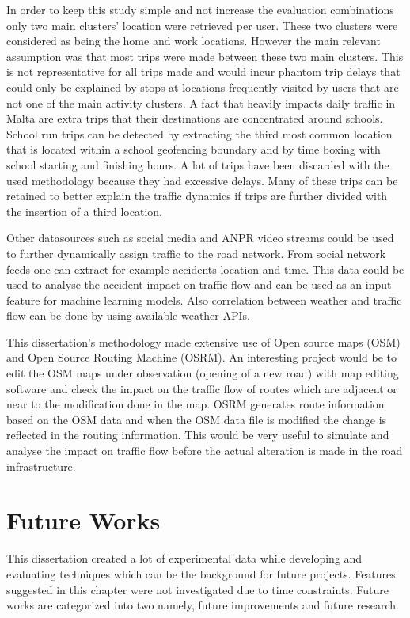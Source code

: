 \documentclass[12pt, a4paper]{report}
\theoremstyle{definition}
\theoremstyle{definition}%
\theoremstyle{definition}%
\theoremstyle{definition}%
\theoremstyle{definition}%
\theoremstyle{definition}%
\begin{document}
In order to keep this study simple and not increase the evaluation combinations only two main clusters' location were retrieved per user. These two clusters were considered as being the home and work locations. However the main relevant assumption was that most trips were made between these two main clusters. This is not representative for all trips made and would incur phantom trip delays that could only be explained by stops at locations frequently visited by users that are not one of the main activity clusters. A fact that heavily impacts daily traffic in Malta are extra trips that their destinations are concentrated around schools. School run trips can be detected by extracting the third most common location that is located within a school geofencing boundary and by time boxing with school starting and finishing hours. A lot of trips have been discarded with the used methodology because they had excessive delays. Many of these trips can be retained to better explain the traffic dynamics if trips are further divided with the insertion of a third location.

Other datasources such as social media and ANPR video streams could be used to further dynamically assign traffic to the road network. From social network feeds one can extract for example accidents location and time. This data could be used to analyse the accident impact on traffic flow and can be used as an input feature for machine learning models. Also correlation between weather and traffic flow can be done by using available weather APIs.

This dissertation's methodology made extensive use of Open source maps (OSM) and Open Source Routing Machine (OSRM). An interesting project would be to edit the OSM maps under observation (opening of a new road) with map editing software and check the impact on the traffic flow of routes which are adjacent or near to the modification done in the map. OSRM generates route information based on the OSM data and when the OSM data file is modified the change is reflected in the routing information. This would be very useful to simulate and analyse the impact on traffic flow before the actual alteration is made in the road infrastructure. 

\chapter{Future Works} \label{chapter:future_work}

This dissertation created a lot of experimental data while developing and evaluating techniques which can be the background for future projects. Features suggested in this chapter were not investigated due to time constraints. Future works are categorized into two namely, future improvements and future research.
\end{document}
